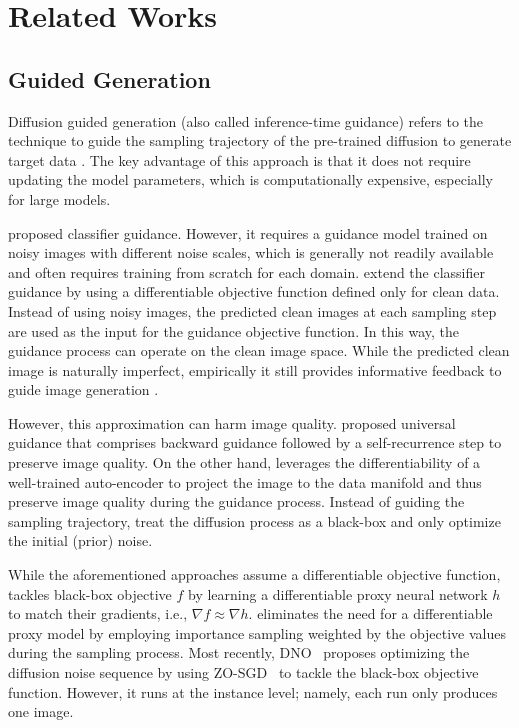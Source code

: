 \section{Related Works}
\subsection{Guided Generation}
Diffusion guided generation (also called inference-time guidance) refers to the technique to guide the sampling trajectory of the pre-trained diffusion to generate target data \citep{10081412,chen2024overview}. The key advantage of this approach is that it does not require updating the model parameters, which is computationally expensive, especially for large models.

\cite{dhariwal2021diffusion} proposed classifier guidance. However, it requires a guidance model trained on noisy images with different noise scales, which is generally not readily available and often requires training from scratch for each domain. \cite{chung2022diffusion,bansal2023universal,he2023manifold} extend the classifier guidance by using a differentiable objective function defined only for clean data. Instead of using noisy images, the predicted clean images at each sampling step are used as the input for the guidance objective function. In this way, the guidance process can operate on the clean image space. While the predicted clean image is naturally imperfect, empirically it still provides informative feedback to guide image generation \citep{bansal2023universal}.

However, this approximation can harm image quality. \cite{bansal2023universal} proposed universal guidance that comprises backward guidance followed by a self-recurrence step to preserve image quality. On the other hand, \cite{he2023manifold} leverages the differentiability of a well-trained auto-encoder to project the image to the data manifold and thus preserve image quality during the guidance process. Instead of guiding the sampling trajectory, \cite{karunratanakul2024optimizing,eyring2024reno} treat the diffusion process as a black-box and only optimize the initial (prior) noise.

While the aforementioned approaches assume a differentiable objective function, \cite{lu2023contrastive} tackles black-box objective $f$ by learning a differentiable proxy neural network $h$ to match their gradients, i.e., $\nabla f \approx \nabla h$. \cite{li2024derivative} eliminates the need for a differentiable proxy model by employing importance sampling weighted by the objective values during the sampling process. Most recently, DNO~\citep{tang2024tuning} proposes optimizing the diffusion noise sequence by using ZO-SGD~\citep{nesterov2017random} to tackle the black-box objective function. However, it runs at the instance level; namely, each run only produces one image.

